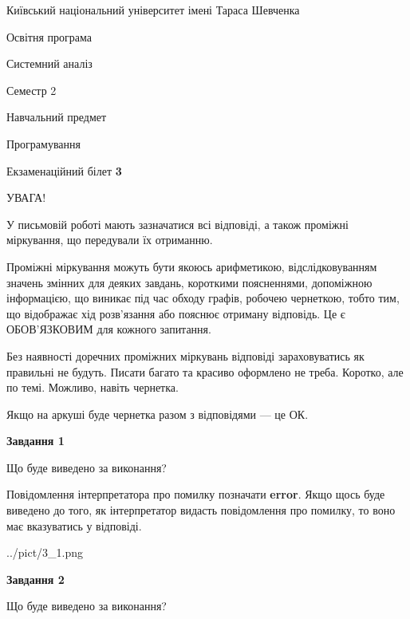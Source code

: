 \documentclass[12pt, ukrainian]{article}
\begin{document}
{{\begin {small}\par
{ \center  Київський національний університет імені Тараса Шевченка \par}
{\parbox {5 cm}{Освітня програма \hfill}{\parbox {7 cm}{Системний аналіз \hfill}}\parbox {6 cm}{\hfill Семестр 2}}\par
{\parbox {5 cm} {Навчальний предмет \hfill}\parbox {7 cm}{Програмування \hfill}\parbox {6cm}{\hfill}\par}\vspace{-7pt} \end{small}}{\center Екзаменаційний білет \No \textbf
{ 3 }\par}}
{
\begin {large}
УВАГА!

У письмовій роботі мають зазначатися всі відповіді, а також проміжні міркування, що передували їх отриманню.

Проміжні міркування можуть бути якоюсь арифметикою, відслідковуванням зна\-чень змінних для деяких завдань,
короткими поясненнями, допоміжною інформацією, що виникає під час обходу графів, робочею чернеткою,
тобто тим, що відображає хід розв’язання або пояснює отриману відповідь.
Це є ОБОВ’ЯЗКОВИМ для кожного запитання.

Без наявності доречних проміжних міркувань відповіді зараховуватись як правиль\-ні не будуть.
Писати багато та красиво оформлено не треба. Коротко, але по темі. Можли\-во, навіть чернетка.

Якщо на аркуші буде чернетка разом з відповідями --- це ОК.

\newpage

{\begin {center}\textbf{Завдання 1}\end {center}}\par
Що буде виведено за виконання?

Повідомлення інтерпретатора про помилку позначати \textbf{error}.
Якщо щось буде виведено до того, як інтерпретатор видасть повідомлення про помилку, 
то воно має вказуватись у відповіді. \par


\begin{center}
	{../pict/3_1.png}
\end{center}
\newpage

{\begin {center}\textbf{Завдання 2}\end {center}}\par
Що буде виведено за виконання?


\end{large}}
\end{document}
